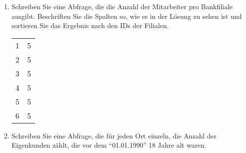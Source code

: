 \begin{enumerate}
\begin{center}
        \end{center}
        \item Schreiben Sie eine Abfrage, die die Anzahl der Mitarbeiter pro
        Bankfiliale ausgibt. Beschriften Sie die Spalten so, wie es in der
        Lösung zu sehen ist und sortieren Sie das Ergebnis nach den IDs der
        Filialen.
        \begin{center}
          \begin{small}
            \tablehead{}
            \begin{msoraclesql}
              \begin{supertabular}{rr}
                1 & 5 \\
                2 & 5 \\
                3 & 5 \\
                4 & 5 \\
                5 & 5 \\
                6 & 5 \\
             \end{supertabular}
            \end{msoraclesql}
          \end{small}
        \end{center}
\clearpage
        \item Schreiben Sie eine Abfrage, die für jeden Ort einzeln, die
        Anzahl der Eigenkunden zählt, die vor dem \enquote{01.01.1990} 18
        Jahre alt waren.
        \begin{center}
          \begin{small}
            \tablehead{}
            \tabletail {
            }
\end{small}
\end{center}
\end{enumerate}
